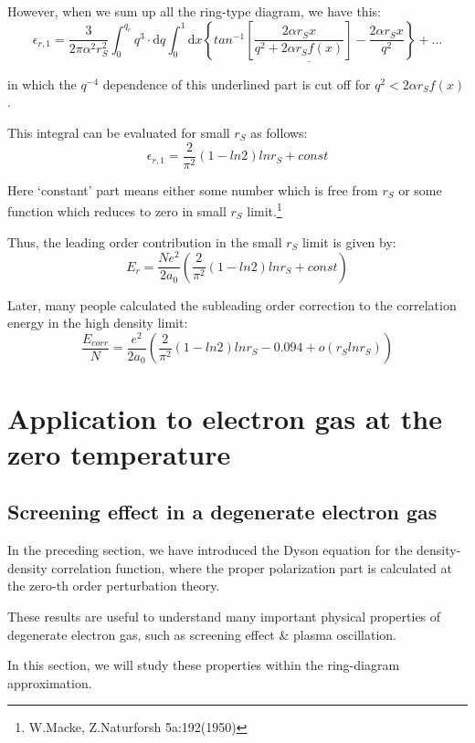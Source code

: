 However, when we sum up all the ring-type diagram, we have this:
\[ \epsilon_{r,1} = \frac{3}{2\pi \alpha^2 r_S^2}\int_0^{q_c} q^3 \cdot \mathrm{d} q \int_0^1 \mathrm{d} x \underline{\left\{ tan^{-1}\left[ \frac{2\alpha r_S x}{q^2 + 2\alpha r_S f(x)} \right] -\frac{2\alpha r_S x}{q^2} \right\}} + \ldots \]

in which the $q^{-4}$ dependence of this underlined part is cut off for $q^2 < 2 \alpha r_S f(x)$.

This integral can be evaluated for small $r_S$ as follows:
\begin{equation} \label{Eqs2.8.42}
\epsilon_{r,1} = \frac{2}{\pi^2}(1-ln 2)ln r_S + const
\end{equation}

Here `constant' part means either some number which is free from $r_S$ or some function which reduces to zero in small $r_S$ limit.\footnote{W.Macke, Z.Naturforsh 5a:192(1950)}

Thus, the leading order contribution in the small $r_S$ limit is given by:
\[E_r = \frac{N e^2}{2 a_0} \left( \frac{2}{\pi^2} (1-ln 2) ln r_S + const \right)\]

Later, many people calculated the subleading order correction to the correlation energy in the high density limit:
\begin{equation} \label{Eqs2.8.43}
\frac{E_{corr}}{N} = \frac{e^2}{2 a_0} \left( \frac{2}{\pi^2}(1 -ln 2) ln r_S - 0.094 + o(r_S ln r_S) \right)
\end{equation}

\chapter{Application to electron gas at the zero temperature}%

\section{Screening effect in a degenerate electron gas}\label{s3-1}

In the preceding section, we have introduced the Dyson equation for the density-density correlation function, where the proper polarization part is calculated at the zero-th order perturbation theory.

These results are useful to understand many important physical properties of degenerate electron gas, such as screening effect \& plasma oscillation.

In this section, we will study these properties within the ring-diagram approximation.

